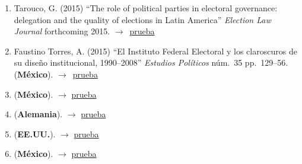 \documentclass[12 pt, letter]{article}
\newenvironment{CitasMiTrabajo}{
    \begin{footnotesize}
    \begin{enumerate}[label={\footnotesize\emph{cita~\arabic*}},ref=\arabic*] %
        \setlength{\itemsep}{.1\itemsep}
        \setlength{\parskip}{.1\parskip}
    }{\end{enumerate}\end{footnotesize}}
\begin{document}
\begin{CitasMiTrabajo}
       \item Tarouco, G. (2015)
            ``The role of political parties in electoral governance: delegation and the quality of elections in Latin America'' 
            \emph{Election Law Journal} forthcoming 2015. $\rightarrow$~\href{http://ericmagar.com/cv/cites/estevezEtalElecStud/taroucoRolePtiesEllGovernance2015elj.pdf}{prueba}

        \item Faustino Torres, A. (2015)
            ``El Instituto Federal Electoral y los claroscuros de su dise\~no institucional, 1990--2008''
            \emph{Estudios Pol\'iticos} n\'um.\ 35 pp.\ 129--56. (\textbf{M\'exico}). $\rightarrow$~\href{http://ericmagar.com/cv/cites/estevezEtalElecStud/faustino.excerpt.pdf}{prueba}

        \item {} (\textbf{M\'exico}).  $\rightarrow$ \href{http://ericmagar.com/cv/cites/estevezEtalElecStud/diazdominguezConfianzaElec2015nexos.pdf}{prueba}

        \item {} (\textbf{Alemania}).  $\rightarrow$ \href{http://ericmagar.com/cv/cites/estevezEtalElecStud/martin2015.pdf}{prueba}

        \item {} (\textbf{EE.UU.}).  $\rightarrow$ \href{http://ericmagar.com/cv/cites/estevezEtalElecStud/hyde2015.pdf}{prueba}

        \item {} (\textbf{M\'exico}).  $\rightarrow$ \href{http://ericmagar.com/cv/cites/estevezEtalElecStud/diazDominguezTrifeGasto2016pl.pdf}{prueba}

        \label{ncites:estevez.magar.rosas.2008} %


\end{CitasMiTrabajo}
\end{document}
